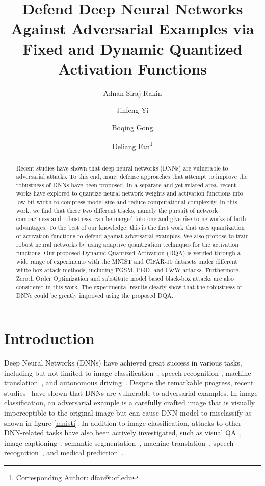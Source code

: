 \documentclass{article}
\title{Defend Deep Neural Networks Against Adversarial Examples via Fixed and Dynamic Quantized Activation Functions}
\author[1]{Adnan Siraj Rakin}
\author[2]{Jinfeng Yi}
\author[3]{Boqing Gong}
\author[1]{Deliang Fan\thanks{Corresponding Author: dfan@ucf.edu}}
\affil[1]{Department of Computer Engineering, University of Central Florida}
\affil[2]{JD AI Research, Beijing, China}
\affil[3]{Tencent AI Lab, Bellevue, WA, USA}
\date{}
\begin{document}
\maketitle

\begin{abstract}
Recent studies have shown that deep neural networks (DNNs) are vulnerable to adversarial attacks. To this end, many defense approaches that attempt to improve the robustness of DNNs have been proposed. In a separate and yet related area, recent works have explored to quantize neural network weights and activation functions into low bit-width to compress model size and reduce computational complexity. In this work, we find that these two different tracks, namely the pursuit of network compactness and robustness, can be merged into one and give rise to  networks of both advantages. To the best of our knowledge, this is the first work that uses quantization of activation functions to defend against adversarial examples. We also propose to train robust neural networks by using adaptive  quantization techniques for the activation functions. Our proposed Dynamic Quantized Activation (DQA) is verified through a wide range of experiments with the MNIST and CIFAR-10 datasets under different white-box attack methods, including FGSM, PGD, and C\&W attacks. Furthermore, Zeroth Order Optimization and substitute model based black-box attacks are also considered in this work. The experimental results clearly show that the robustness of DNNs could be greatly improved using the proposed DQA. 


\end{abstract}


\section{Introduction}
Deep Neural Networks (DNNs) have achieved great success in various tasks, including but not limited to image classification~\cite{krizhevsky2012imagenet},  speech recognition \cite{hinton2012deep}, machine translation~\cite{bahdanau2014neural}, and autonomous driving~\cite{chen2015deepdriving}. Despite the remarkable progress, recent studies~\cite{szegedy2013intriguing,goodfellow2014explaining,carlini2017towards} have shown that DNNs are 
vulnerable to adversarial examples. In image classification, an adversarial example is a carefully crafted image that is visually imperceptible to the original image but can cause DNN model to misclassify as shown in figure \ref{mnisti}. In addition to image classification, attacks to other DNN-related tasks have also been actively investigated, such as visual QA~\cite{xu2017can}, image captioning~\cite{chen2017show},  semantic segmentation~\cite{metzen2017universal}, machine translation~\cite{cheng2018seq2sick}, speech recognition~\cite{ carlini2018audio}, and medical prediction~\cite{sun2018identify}.  
\end{document}
